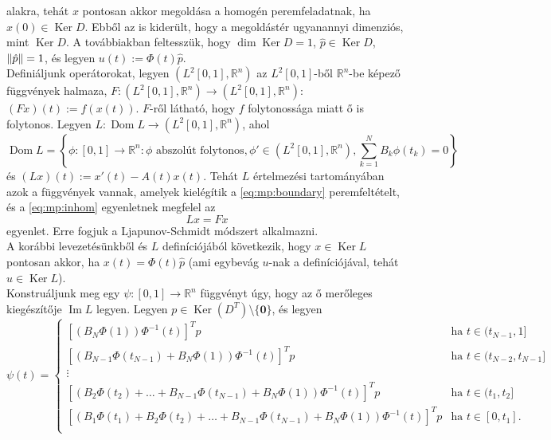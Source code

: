 \documentclass[oneside, titlepage, 12pt, a4paper]{report}
\DeclareMathOperator{\Ima}{Im}	%
\DeclareMathOperator{\Ker}{Ker}	%
\DeclareMathOperator{\Dom}{Dom}	%
\DeclarePairedDelimiter\norm{\lVert}{\rVert}	%
\begin{document}
alakra, tehát $x$ pontosan akkor megoldása a homogén peremfeladatnak, ha $x(0) \in \Ker D$. Ebből az is kiderült, hogy a megoldástér ugyanannyi dimenziós, mint $\Ker D$. A továbbiakban feltesszük, hogy $\dim \Ker D = 1$, $\hat{p} \in \Ker D$, $\norm{\hat{p}} = 1$, és legyen $u(t) := \Phi(t) \hat{p}$. \\
Definiáljunk operátorokat, legyen $( L^2[0, 1], \mathbb{R}^n)$ az $L^2[0, 1]$-ből $\mathbb{R}^n$-be képező függvények halmaza, $F : ( L^2[0, 1], \mathbb{R}^n) \rightarrow ( L^2[0, 1], \mathbb{R}^n)$: $(Fx)(t) := f(x(t))$. $F$-ről látható, hogy $f$ folytonossága miatt ő is folytonos. Legyen $L : \Dom L \rightarrow ( L^2[0, 1], \mathbb{R}^n)$, ahol
\begin{equation*}
\Dom L = \left\{ \phi : [0, 1] \rightarrow \mathbb{R}^n : \phi \text{ abszolút folytonos}, \phi' \in ( L^2[0, 1], \mathbb{R}^n), \sum_{k = 1}^N B_k \phi(t_k) = 0 \right\}
\end{equation*}
és $(Lx)(t) := x'(t) - A(t) x(t)$. Tehát $L$ értelmezési tartományában azok a függvények vannak, amelyek kielégítik a \eqref{eq:mp:boundary} peremfeltételt, és a \eqref{eq:mp:inhom} egyenletnek megfelel az
\begin{equation}
Lx = Fx \label{eq:mp:operator}
\end{equation}
egyenlet. Erre fogjuk a Ljapunov-Schmidt módszert alkalmazni. \\
A korábbi levezetésünkből és $L$ definíciójából következik, hogy $x \in \Ker L$ pontosan akkor, ha $x(t) = \Phi(t) \hat{p}$ (ami egybevág $u$-nak a definíciójával, tehát $u \in \Ker L$). \\
Konstruáljunk meg egy $\psi : [0, 1] \rightarrow \mathbb{R}^n$ függvényt úgy, hogy az ő merőleges kiegészítője $\Ima L$ legyen. Legyen $p \in \Ker(D^T) \setminus \{ \mathbf{0} \}$, és legyen
\begin{equation*}
\psi(t) = 
	\begin{cases}
	\left[ \left( B_N \Phi(1) \right) \Phi^{-1}(t) \right]^T p &\text{ha } t \in (t_{N-1}, 1] \\
	\left[ \left( B_{N-1} \Phi(t_{N-1}) +  B_N \Phi(1) \right) \Phi^{-1}(t) \right]^T p &\text{ha } t \in (t_{N-2}, t_{N-1}]  \\
	\vdots &\\
	\left[ \left( B_2 \Phi(t_2) + \dots + B_{N-1} \Phi(t_{N-1}) +  B_N \Phi(1) \right) \Phi^{-1}(t) \right]^T p &\text{ha } t \in (t_1, t_2]  \\
	\left[ \left( B_1 \Phi(t_1) + B_2 \Phi(t_2) + \dots + B_{N-1} \Phi(t_{N-1}) +  B_N \Phi(1) \right) \Phi^{-1}(t) \right]^T p &\text{ha } t \in [0, t_1]. \\
	\end{cases}
\end{equation*}
\end{document}
